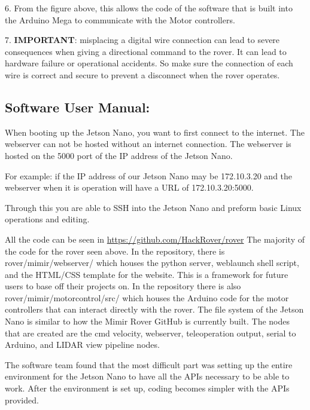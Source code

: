 \documentclass[a4paper, 10pt]{article}
\begin{document}
6. From the figure above, this allows the code of the software that is built into the Arduino Mega to communicate with the Motor controllers.

7. \textbf{IMPORTANT}: misplacing a digital wire connection can lead to severe consequences when giving a directional command to the rover. It can lead to hardware failure or operational accidents. So make sure the connection of each wire is correct and secure to prevent a disconnect when the rover operates.

\subsection{Software User Manual:}
    When booting up the Jetson Nano, you want to first connect to the internet. The webserver can not be hosted without an internet connection. The webserver is hosted on the 5000 port of the IP address of the Jetson Nano. 
    
    For example: if the IP address of our Jetson Nano may be 172.10.3.20 and the webserver when it is operation will have a URL of 172.10.3.20:5000.

    Through this you are able to SSH into the Jetson Nano and preform basic Linux operations and editing.
    
    All the code can be seen in \url{https://github.com/HackRover/rover}
    The majority of the code for the rover seen above. In the repository, there is rover/mimir/webserver/ which houses the python server, weblaunch shell script, and the HTML/CSS template for the website. This is a framework for future users to base off their projects on.
    In the repository there is also rover/mimir/motorcontrol/src/ which houses the Arduino code for the motor controllers that can interact directly with the rover.
    The file system of the Jetson Nano is similar to how the Mimir Rover GitHub is currently built. 
    The nodes that are created are the cmd velocity, webserver, teleoperation output, serial to Arduino, and LIDAR view pipeline nodes.

    The software team found that the most difficult part was setting up the entire environment for the Jetson Nano to have all the APIs necessary to be able to work. After the environment is set up, coding becomes simpler with the APIs provided. 
\end{document}
